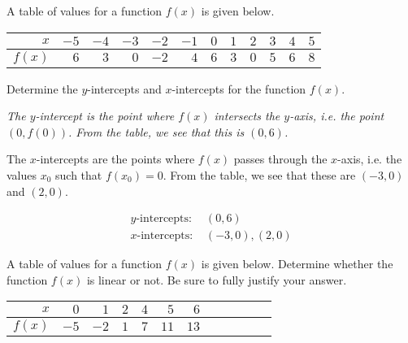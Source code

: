\documentclass[12pt,letterpaper]{exam}
\begin{document}
\examtitle
{} 
\scores
\bottomline
\newpage

\begin{questions}

\newpage
\question[6] A table of values for a function $f(x)$ is given below.
	\begin{table}[!ht]
	\centering
	\begin{tabular}{r||rrrrrrrrrrr}
	$x$ & $-5$ & $-4$ & $-3$ & $-2$ & $-1$ & $0$ & $1$ & $2$ & $3$ & $4$ & $5$ \\ \hline
	$f(x)$ & $6$ & $3$ & $0$ & $-2$ & $4$ & $6$ & $3$ & $0$ & $5$ & $6$ & $8$
	\end{tabular}
	\end{table} \par
Determine the $y$-intercepts and $x$-intercepts for the function $f(x)$. \pspace

{\itshape The $y$-intercept is the point where $f(x)$ intersects the $y$-axis, i.e. the point $(0, f(0))$. From the table, we see that this is $(0, 6)$. \pspace

The $x$-intercepts are the points where $f(x)$ passes through the $x$-axis, i.e. the values $x_0$ such that $f(x_0)= 0$. From the table, we see that these are $(-3, 0)$ and $(2, 0)$. \pspace

	\[
	\begin{aligned}
	y\text{-intercepts: }& (0, 6) \\[0.3cm]
	x\text{-intercepts: }& (-3, 0), (2, 0)
	\end{aligned}
	\]
}



\newpage



\newpage
\question[6] A table of values for a function $f(x)$ is given below. Determine whether the function $f(x)$ is linear or not. Be sure to fully justify your answer. \par
	\begin{table}[!ht]
	\centering
	\begin{tabular}{r||rrrrrrrrrrr}
	$x$ & $0$ & $1$ & $2$ & $4$ & $5$ & $6$ \\ \hline
	$f(x)$ & $-5$ & $-2$ & $1$ & $7$ & $11$ & $13$
	\end{tabular}
	\end{table} \pspace


\end{questions}
\end{document}
